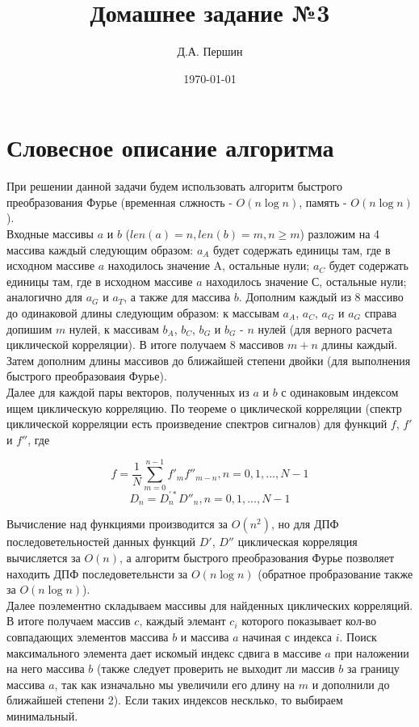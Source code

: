 \documentclass[12pt]{article}
\title{\bf Домашнее задание №3}
\author{Д.А. Першин}
\date{\today}
\begin{document}
\maketitle


\section{Словесное описание алгоритма}

При решении данной задачи будем использовать алгоритм быстрого преобразования Фурье (временная слжность - $O(n\log n)$, память - $O(n\log n)$).\\
 Входные массивы $a$ и $b$ ($len(a)=n, len(b)=m, n\geq m$) разложим на 4 массива каждый следующим образом: $a_A$ будет содержать единицы там, где в исходном массиве $a$ находилось значение A, остальные нули; $a_C$ будет содержать единицы там, где в исходном массиве $a$ находилось значение С, остальные нули; аналогично для $a_G$ и $a_T$, а также для массива $b$. Дополним каждый из 8 массиво до одинаковой длины следующим образом: к массывам $a_A$, $a_C$, $a_G$ и $a_G$ справа допишим $m$ нулей, к массивам $b_A$, $b_C$, $b_G$ и $b_G$ - $n$ нулей (для верного расчета циклической корреляции). В итоге получаем 8 массивов $m+n$ длины каждый. Затем дополним длины массивов до ближайшей степени двойки (для выполнения быстрого преобразоваия Фурье).\\

Далее для каждой пары векторов, полученных из $a$ и $b$ с одинаковым индексом ищем циклическую корреляцию. По теореме о циклической корреляции (спектр циклической корреляции есть произведение спектров сигналов) для функций $f$, $f'$ и $f''$, где 

$$f = \frac{1}{N} \sum_{m=0}^{n-1} f'_m f''_{m-n}, n = 0,1,...,N-1 $$
$$D_n = D^{'*}_n D''_n, n = 0,1,...,N-1$$

Вычисление над функциями производится за $O(n^2)$, но для ДПФ последоветельностей данных функций $D'$, $D''$ циклическая корреляция вычисляется за $O(n)$, а алгоритм быстрого преобразования Фурье позволяет находить ДПФ последоветельнсти за $O(n\log n)$ (обратное пробразование также за $O(n\log n)$).\\

Далее поэлементно складываем массивы для найденных циклических корреляций. В итоге получаем массив $c$, каждый элемант $c_i$ которого показывает кол-во совпадающих элементов массива $b$ и массива $a$ начиная с индекса $i$. Поиск максимального элемента дает искомый индекс сдвига в массиве $a$ при наложении на него массива $b$ (также следует проверить не выходит ли массив $b$ за границу массива $a$, так как изначально мы увеличили его длину на $m$ и дополнили до ближайшей степени 2). Если таких индексов несклько, то выбираем минимальный.
\end{document}
